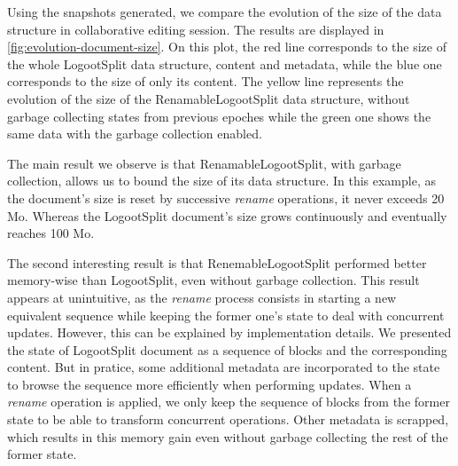 \documentclass{article}
\theoremstyle{definition}
\begin{document}
Using the snapshots generated, we compare the evolution of the size of the data structure in collaborative editing session.
The results are displayed in \autoref{fig:evolution-document-size}.
On this plot, the red line corresponds to the size of the whole LogootSplit data structure, content and metadata, while the blue one corresponds to the size of only its content.
The yellow line represents the evolution of the size of the RenamableLogootSplit data structure, without garbage collecting states from previous epoches while the green one shows the same data with the garbage collection enabled.

The main result we observe is that RenamableLogootSplit, with garbage collection, allows us to bound the size of its data structure.
In this example, as the document's size is reset by successive \emph{rename} operations, it never exceeds 20 Mo.
Whereas the LogootSplit document's size grows continuously and eventually reaches 100 Mo.

The second interesting result is that RenemableLogootSplit performed better memory-wise than LogootSplit, even without garbage collection.
This result appears at unintuitive, as the \emph{rename} process consists in starting a new equivalent sequence while keeping the former one's state to deal with concurrent updates.
However, this can be explained by implementation details.
We presented the state of LogootSplit document as a sequence of blocks and the corresponding content.
But in pratice, some additional metadata are incorporated to the state to browse the sequence more efficiently when performing updates.
When a \emph{rename} operation is applied, we only keep the sequence of blocks from the former state to be able to transform concurrent operations.
Other metadata is scrapped, which results in this memory gain even without garbage collecting the rest of the former state.


\end{document}
